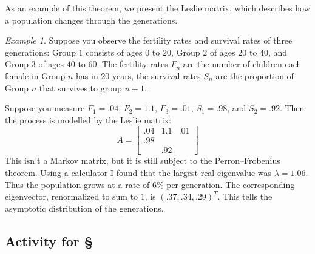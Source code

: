 \documentclass[11pt,oneside]{amsbook}
\theoremstyle{definition}
\theoremstyle{plain}
\theoremstyle{definition}
\theoremstyle{remark}
\newtheorem{example}[theorem]{Example}
\numberwithin{equation}{section}
\numberwithin{figure}{section}
\begin{document}
As an example of this theorem, we present the Leslie matrix, which describes how a population changes through the generations.
  
\begin{example}
  Suppose you observe the fertility rates and survival rates of three generations: Group $1$ consists of ages $0$ to $20$, Group $2$ of ages $20$ to $40$, and Group $3$ of ages $40$ to $60$. The fertility rates $F_n$ are the number of children each female in Group $n$ has in $20$ years, the survival rates $S_n$ are the proportion of Group $n$ that survives to group $n+1$.

  Suppose you measure $F_1=.04$, $F_2=1.1$, $F_3=.01$, $S_1=.98$, and $S_2=.92$. Then the process is modelled by the Leslie matrix:
  \[A=\begin{bmatrix}.04&1.1&.01\\.98\\&.92\end{bmatrix}
  \]
  This isn't a Markov matrix, but it is still subject to the Perron--Frobenius theorem. Using a calculator I found that the largest real eigenvalue was $\lambda=1.06$. Thus the population grows at a rate of 6\% per generation. The corresponding eigenvector, renormalized to sum to $1$, is $(.37,.34,.29)^T$. This tells the asymptotic distribution of the generations.
\end{example}

\newpage
\subsection*{Activity for \S \thesection}
\end{document}
